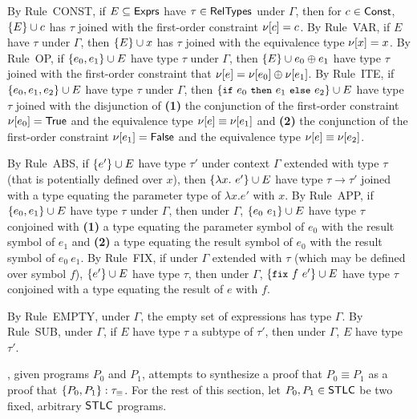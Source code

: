 %
By Rule~CONST, if $E \subseteq \mathsf{Exprs}$ have $\tau \in \mathsf{RelTypes}$ under
$\Gamma$, then for $c \in \mathsf{Const}$, $\{ E \} \cup c$ has $\tau$ joined with
the first-order constraint $\nu[ c ] = c$.
By Rule~VAR, if $E$ have $\tau$ under $\Gamma$, then $\{ E \} \cup x$ has
$\tau$ joined with the equivalence type $\nu[ x ] = x$.
By Rule~OP, if $\{  e_0, e_1  \} \cup E$ have type $\tau$ under
$\Gamma$, then $\{  E  \} \cup  e_0 \oplus e_1 $ have type $\tau$ joined
with the first-order constraint that $\nu[ e ] = \nu[ e_0 ] \oplus
\nu[ e_1 ]$.
By Rule~ITE, if $\{  e_0, e_1, e_2  \} \cup E$ have type $\tau$
under $\Gamma$, then $\add { \ite{ e_0 }{ e_1 }{ e_2 } }{ E }$ have
type $\tau$ joined with the disjunction of \textbf{(1)} the
conjunction of the first-order constraint $\nu[ e_0 ] = \mathsf{True}$ and
the equivalence type $\nu[ e ] \equiv \nu[ e_1 ]$ and %
\textbf{(2)} the conjunction of the first-order constraint
$\nu[ e_1 ] = \mathsf{False}$ and the equivalence type $\nu[ e ] \equiv
\nu[ e_2 ]$.

By Rule~ABS, if $\{  e'  \} \cup  E $ have type $\tau'$ under context
$\Gamma$ extended with type $\tau$ (that is potentially defined over
$x$), then $\{  \lambda x.\ e'  \} \cup  E $ have type $\tau \rightarrow
\tau'$ joined with a type equating the parameter type of $\lambda
x. e'$ with $x$.
By Rule~APP, if $\{  e_0, e_1  \} \cup E$ have type $\tau$ under
$\Gamma$, then under $\Gamma$, $\{  e_0\ e_1  \} \cup  E $ have type
$\tau$ conjoined with %
\textbf{(1)} a type equating the parameter symbol of $e_0$ with the
result symbol of $e_1$ and %
\textbf{(2)} a type equating the result symbol of $e_0$ with the
result symbol of $e_0\ e_1$.
By Rule~FIX, if under $\Gamma$ extended with $\tau$ (which may be
defined over symbol $f$), $\{  e'  \} \cup  E $ have type $\tau$, then
under $\Gamma$, $\add{ \fix{ f }{ e' } }{ E }$ have type $\tau$
conjoined with a type equating the result of $e$ with $f$.

By Rule~EMPTY, under $\Gamma$, the empty set of expressions has type
$\Gamma$.
%
By Rule~SUB, under $\Gamma$, if $E$ have type $\tau$ a subtype of
$\tau'$, then under $\Gamma$, $E$ have type $\tau'$.

% 
\sys, given programs $P_0$ and $P_1$, attempts to synthesize a proof
that $P_0 \equiv P_1$ as a proof that $\{  P_0, P_1  \} :
\tau_{\equiv}$.
%
For the rest of this section, let $P_0, P_1 \in \mathsf{STLC}$ be two fixed,
arbitrary $\mathsf{STLC}$ programs.

